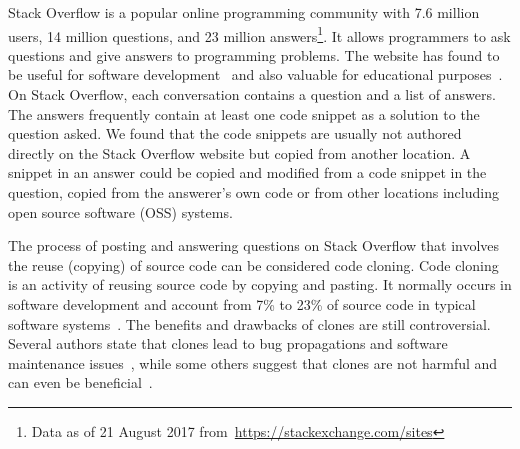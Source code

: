 \documentclass[10pt,journal,compsoc]{IEEEtran}
\begin{document}
\IEEEdisplaynontitleabstractindextext



%
\IEEEpeerreviewmaketitle


Stack Overflow is a popular online programming community with 7.6
million users, 14 million questions, and 23 million answers\footnote{Data as of 21
	August 2017 from~\url{https://stackexchange.com/sites}}. It allows programmers to ask questions and give answers
to programming problems. The website has found to be useful for
software
development~\cite{Ponzanelli2013,Ponzanelli2014,Keivanloo2014,Park2014,
	Stolee2014,Subramanian2013,Diamantopoulos2015,Treude2016} and also
valuable for educational purposes~\cite{Nasehi2012}. On Stack
Overflow, each conversation contains a question and a list of
answers. The answers frequently contain at least one code snippet as
a solution to the question asked. We found that the code snippets are
usually not authored directly on the Stack Overflow website but copied
from another location. A snippet in an answer could be copied and modified
from a code snippet in the question, copied from the answerer's own
code or from other locations including open source software (OSS)
systems. 

The process of posting and answering questions on Stack
Overflow that involves the reuse (copying) of source code can be considered
code cloning.
Code cloning is an activity of reusing source code by copying and
pasting. It normally occurs in software development and account from
7\% to 23\% of source code in typical software
systems~\cite{Bellon2007}. The benefits and drawbacks of clones are
still controversial. Several authors state that clones lead to bug
propagations and software maintenance issues~\cite{Kamiya2002}, while
some others suggest that clones are not harmful and can even be
beneficial~\cite{Saini2016,Kapser2006}.
\end{document}

